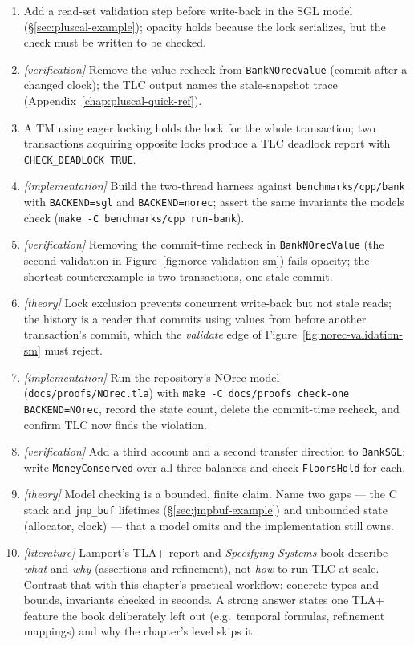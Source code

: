 \begin{enumerate}
    \item Add a read-set validation step before write-back in the SGL model
          (\S\ref{sec:pluscal-example}); opacity holds because the lock
          serializes, but the check must be written to be checked.
    \item \emph{[verification]} Remove the value recheck from
          \texttt{BankNOrecValue} (commit after a changed clock); the TLC
          output names the stale-snapshot trace
          (Appendix~\ref{chap:pluscal-quick-ref}).
    \item A TM using eager locking holds the lock for the whole
          transaction; two transactions acquiring opposite locks produce a
          TLC deadlock report with \texttt{CHECK\_DEADLOCK TRUE}.
    \item \emph{[implementation]} Build the two-thread harness against
          \texttt{benchmarks/cpp/bank} with \texttt{BACKEND=sgl} and
          \texttt{BACKEND=norec}; assert the same invariants the models
          check (\texttt{make -C benchmarks/cpp run-bank}).
    \item \emph{[verification]} Removing the commit-time recheck in
          \texttt{BankNOrecValue} (the second validation in
          Figure~\ref{fig:norec-validation-sm}) fails opacity; the shortest
          counterexample is two transactions, one stale commit.
    \item \emph{[theory]} Lock exclusion prevents concurrent write-back but
          not stale reads; the history is a reader that commits using values
          from before another transaction's commit, which the
          \emph{validate} edge of Figure~\ref{fig:norec-validation-sm} must
          reject.
    \item \emph{[implementation]} Run the repository's NOrec model
          (\texttt{docs/proofs/NOrec.tla}) with
          \texttt{make -C docs/proofs check-one BACKEND=NOrec}, record the
          state count, delete the commit-time recheck, and confirm TLC now
          finds the violation.
    \item \emph{[verification]} Add a third account and a second transfer
          direction to \texttt{BankSGL}; write
          \texttt{MoneyConserved} over all three balances and check
          \texttt{FloorsHold} for each.
    \item \emph{[theory]} Model checking is a bounded, finite claim.  Name
          two gaps --- the C stack and \texttt{jmp\_buf} lifetimes
          (\S\ref{sec:jmpbuf-example}) and unbounded state (allocator,
          clock) --- that a model omits and the implementation still owns.
    \item \emph{[literature]} Lamport's TLA+ report and \emph{Specifying
          Systems} book describe \emph{what} and \emph{why} (assertions and
          refinement), not \emph{how} to run TLC at scale.  Contrast that
          with this chapter's practical workflow: concrete types and
          bounds, invariants checked in seconds.  A strong answer states one
          TLA+ feature the book deliberately left out (e.g.\ temporal
          formulas, refinement mappings) and why the chapter's level skips
          it.
\end{enumerate}

